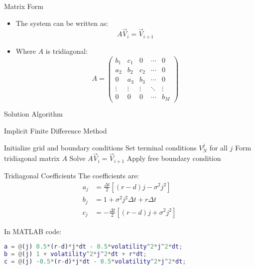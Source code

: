 \documentclass{beamer}
\begin{document}
\begin{frame}{Matrix Form}
    \begin{itemize}
        \item The system can be written as:
        \[A\vec{V}_i = \vec{V}_{i+1}\]
        \item Where $A$ is tridiagonal:
        \[A = \begin{pmatrix}
            b_1 & c_1 & 0 & \cdots & 0 \\
            a_2 & b_2 & c_2 & \cdots & 0 \\
            0 & a_3 & b_3 & \cdots & 0 \\
            \vdots & \vdots & \vdots & \ddots & \vdots \\
            0 & 0 & 0 & \cdots & b_M
        \end{pmatrix}\]
    \end{itemize}
\end{frame}

\begin{frame}{Solution Algorithm}
    \begin{algorithm}[H]
    \caption{Implicit Finite Difference Method}
    \begin{algorithmic}[1]
        \State Initialize grid and boundary conditions
        \State Set terminal conditions $V_N^j$ for all $j$
            \State Form tridiagonal matrix $A$
            \State Solve $A\vec{V}_i = \vec{V}_{i+1}$
            \State Apply free boundary condition
        \EndFor
    \end{algorithmic}
    \end{algorithm}
\end{frame}

\begin{frame}[fragile]{Tridiagonal Coefficients}
    The coefficients are:
    \begin{align*}
        a_j &= \frac{\Delta t}{2}[(r-d)j - \sigma^2j^2] \\
        b_j &= 1 + \sigma^2j^2\Delta t + r\Delta t \\
        c_j &= -\frac{\Delta t}{2}[(r-d)j + \sigma^2j^2]
    \end{align*}
    
    In MATLAB code:
    \begin{lstlisting}[language=Matlab]
a = @(j) 0.5*(r-d)*j*dt - 0.5*volatility^2*j^2*dt;
b = @(j) 1 + volatility^2*j^2*dt + r*dt;
c = @(j) -0.5*(r-d)*j*dt - 0.5*volatility^2*j^2*dt;
    \end{lstlisting}
\end{frame}
\end{document}
